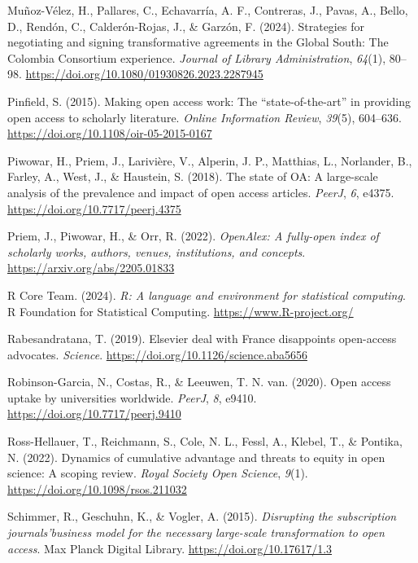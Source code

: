 \documentclass[a4paper,man,floatsintext,longtable,noextraspace,10pt]{apa6}
\newlength{\cslhangindent}
\newenvironment{CSLReferences}[2] %
{\begin{list}{}{%
  \setlength{\itemindent}{0pt}
  \setlength{\leftmargin}{0pt}
  \setlength{\parsep}{0pt}
  \ifodd #1
  \setlength{\leftmargin}{\cslhangindent}
  \setlength{\itemindent}{-1\cslhangindent}
  \fi
  \setlength{\itemsep}{#2\baselineskip}}}
{\end{list}}
\begin{document}
\begin{CSLReferences}{1}{0}
Muñoz-Vélez, H., Pallares, C., Echavarría, A. F., Contreras, J., Pavas,
A., Bello, D., Rendón, C., Calderón-Rojas, J., \& Garzón, F. (2024).
Strategies for negotiating and signing transformative agreements in the
{Global South}: The {Colombia Consortium} experience. \emph{Journal of
Library Administration}, \emph{64}(1), 80--98.
\url{https://doi.org/10.1080/01930826.2023.2287945}

Pinfield, S. (2015). Making open access work: The {``state-of-the-art''}
in providing open access to scholarly literature. \emph{Online
Information Review}, \emph{39}(5), 604--636.
\url{https://doi.org/10.1108/oir-05-2015-0167}

Piwowar, H., Priem, J., Larivière, V., Alperin, J. P., Matthias, L.,
Norlander, B., Farley, A., West, J., \& Haustein, S. (2018). The state
of {OA}: A large-scale analysis of the prevalence and impact of open
access articles. \emph{{PeerJ}}, \emph{6}, e4375.
\url{https://doi.org/10.7717/peerj.4375}

Priem, J., Piwowar, H., \& Orr, R. (2022). \emph{OpenAlex: A fully-open
index of scholarly works, authors, venues, institutions, and concepts}.
\url{https://arxiv.org/abs/2205.01833}

R Core Team. (2024). \emph{R: A language and environment for statistical
computing}. R Foundation for Statistical Computing.
\url{https://www.R-project.org/}

Rabesandratana, T. (2019). Elsevier deal with {France} disappoints
open-access advocates. \emph{Science}.
\url{https://doi.org/10.1126/science.aba5656}

Robinson-Garcia, N., Costas, R., \& Leeuwen, T. N. van. (2020). Open
access uptake by universities worldwide. \emph{{PeerJ}}, \emph{8},
e9410. \url{https://doi.org/10.7717/peerj.9410}

Ross-Hellauer, T., Reichmann, S., Cole, N. L., Fessl, A., Klebel, T., \&
Pontika, N. (2022). Dynamics of cumulative advantage and threats to
equity in open science: A scoping review. \emph{Royal Society Open
Science}, \emph{9}(1). \url{https://doi.org/10.1098/rsos.211032}

Schimmer, R., Geschuhn, K., \& Vogler, A. (2015). \emph{{Disrupting the
subscription journals'business model for the necessary large-scale
transformation to open access}}. Max Planck Digital Library.
\url{https://doi.org/10.17617/1.3}


\end{CSLReferences}
\end{document}
